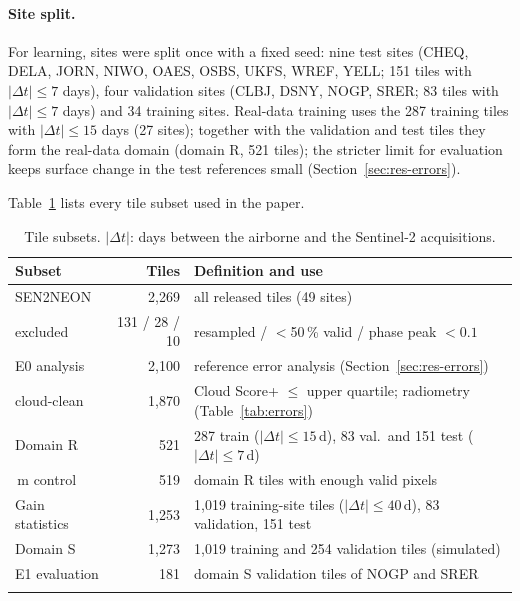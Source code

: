 \documentclass[pdflatex,sn-basic,referee,lineno]{sn-jnl}
\begin{document}
\paragraph{Site split.} For learning, sites were split once with a fixed seed: nine test sites (CHEQ, DELA, JORN,
NIWO, OAES, OSBS, UKFS, WREF, YELL; 151 tiles with $|\Delta t|\le7$ days), four validation sites (CLBJ, DSNY,
NOGP, SRER; 83 tiles with $|\Delta t|\le7$ days) and 34 training sites. Real-data training uses the 287 training
tiles with $|\Delta t|\le15$ days (27 sites); together with the validation and test tiles they form the real-data
domain (domain R, 521 tiles); the stricter limit for evaluation keeps surface change in the test
references small (Section~\ref{sec:res-errors}).

Table~\ref{tab:flow} lists every tile subset used in the paper.

\begin{table}[t]
\caption{Tile subsets. $|\Delta t|$: days between the airborne and the Sentinel-2 acquisitions.}\label{tab:flow}
\footnotesize\setlength{\tabcolsep}{3pt}
\begin{tabular*}{\textwidth}{@{\extracolsep\fill}lrl}
\toprule
Subset & Tiles & Definition and use \\
\midrule
SEN2NEON & 2,269 & all released tiles (49 sites) \\
\quad excluded & 131 / 28 / 10 & resampled / $<$50\,\% valid / phase peak $<0.1$ \\
E0 analysis & 2,100 & reference error analysis (Section~\ref{sec:res-errors}) \\
\quad cloud-clean & 1,870 & Cloud Score+ $\le$ upper quartile; radiometry (Table~\ref{tab:errors}) \\
Domain R & 521 & 287 train ($|\Delta t|\le15$\,d), 83 val.\ and 151 test ($|\Delta t|\le7$\,d) \\
\quad 10\,m control & 519 & domain R tiles with enough valid pixels \\
Gain statistics & 1,253 & 1,019 training-site tiles ($|\Delta t|\le40$\,d), 83 validation, 151 test \\
Domain S & 1,273 & 1,019 training and 254 validation tiles (simulated) \\
\quad E1 evaluation & 181 & domain S validation tiles of NOGP and SRER \\
\botrule
\end{tabular*}
\end{table}
\end{document}
